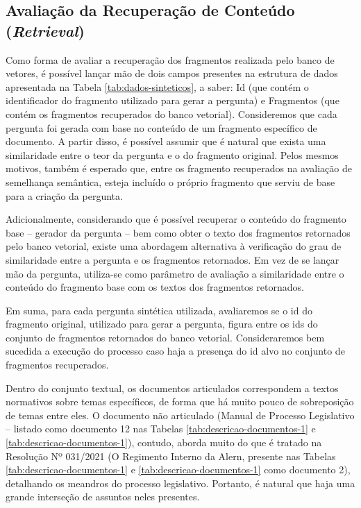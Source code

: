 \subsection{Avaliação da Recuperação de Conteúdo (\textit{Retrieval})}
\label{subsec:Metodologia.6.2}
Como forma de avaliar a recuperação dos fragmentos realizada pelo banco de vetores, é possível lançar mão de dois campos presentes na estrutura de dados apresentada na Tabela \ref{tab:dados-sinteticos}, a saber: Id (que contém o identificador do fragmento utilizado para gerar a pergunta) e Fragmentos (que contém os fragmentos recuperados do banco vetorial). Consideremos que cada pergunta foi gerada com base no conteúdo de um fragmento específico de documento. A partir disso, é possível assumir que é natural que exista uma similaridade entre o teor da pergunta e o do fragmento original. Pelos mesmos motivos, também é esperado que, entre os fragmento recuperados na avaliação de semelhança semântica, esteja incluído o próprio fragmento que serviu de base para a criação da pergunta.

Adicionalmente, considerando que é possível recuperar o conteúdo do fragmento base -- gerador da pergunta -- bem como obter o texto dos fragmentos retornados pelo banco vetorial, existe uma abordagem alternativa à verificação do grau de similaridade entre a pergunta e os fragmentos retornados. Em vez de se lançar mão da pergunta, utiliza-se como parâmetro de avaliação a similaridade entre o conteúdo do fragmento base com os textos dos fragmentos retornados.

Em suma, para cada pergunta sintética utilizada, avaliaremos se o id do fragmento original, utilizado para gerar a pergunta, figura entre os ids do conjunto de fragmentos retornados do banco vetorial. Consideraremos bem sucedida a execução do processo caso haja a presença do id alvo no conjunto de fragmentos recuperados.

Dentro do conjunto textual, os documentos articulados correspondem a textos normativos sobre temas específicos, de forma que há muito pouco de sobreposição de temas entre eles. O documento não articulado (Manual de Processo Legislativo -- listado como documento 12 nas Tabelas \ref{tab:descricao-documentos-1} e \ref{tab:descricao-documentos-1}), contudo, aborda muito do que é tratado na Resolução Nº 031/2021 (O Regimento Interno da Alern, presente nas Tabelas \ref{tab:descricao-documentos-1} e \ref{tab:descricao-documentos-1} como documento 2), detalhando os meandros do processo legislativo. Portanto, é natural que haja uma grande interseção de assuntos neles presentes.

